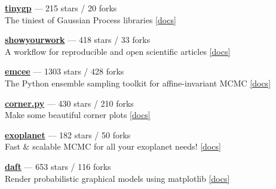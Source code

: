 \item \href{https://github.com/dfm/tinygp}{{\bf tinygp}} --- 215 stars / 20 forks \\
The tiniest of Gaussian Process libraries \href{https://tinygp.readthedocs.io}{[docs]}

\item \href{https://github.com/showyourwork/showyourwork}{{\bf showyourwork}} --- 418 stars / 33 forks \\
A workflow for reproducible and open scientific articles \href{https://show-your.work}{[docs]}

\item \href{https://github.com/dfm/emcee}{{\bf emcee}} --- 1303 stars / 428 forks \\
The Python ensemble sampling toolkit for affine-invariant MCMC \href{https://emcee.readthedocs.io}{[docs]}

\item \href{https://github.com/dfm/corner.py}{{\bf corner.py}} --- 430 stars / 210 forks \\
Make some beautiful corner plots \href{http://corner.readthedocs.io}{[docs]}

\item \href{https://github.com/exoplanet-dev/exoplanet}{{\bf exoplanet}} --- 182 stars / 50 forks \\
Fast {\&} scalable MCMC for all your exoplanet needs!  \href{https://docs.exoplanet.codes}{[docs]}

\item \href{https://github.com/daft-dev/daft}{{\bf daft}} --- 653 stars / 116 forks \\
Render probabilistic graphical models using matplotlib \href{https://docs.daft-pgm.org}{[docs]}